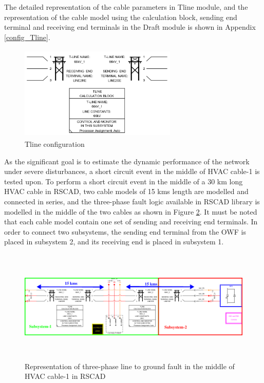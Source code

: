 The detailed representation of the cable parameters in Tline module, and the representation of the cable model using the calculation block, sending end terminal and receiving end terminals in the Draft module is shown in Appendix \ref{config_Tline}.

\begin{figure}[H]
  \centering
  \includegraphics[height = 4.5cm,width = 7.5cm]{Diagrams/Chapter_4/TlineParaBlock.PNG}  
  \caption{Tline configuration}
  \label{fig:Tline_calculationbox_RSCAD}
\end{figure}

As the significant goal is to estimate the dynamic performance of the network under severe disturbances, a short circuit event in the middle of \gls{HVAC} cable-1 is tested upon. To perform a short circuit event in the middle of a 30 km long \gls{HVAC} cable in RSCAD, two cable models of 15 kms length are modelled and connected in series, and the three-phase fault logic available in RSCAD library is modelled in the middle of the two cables as shown in Figure \ref{fig:Subsystem_Trial}. It must be noted that each cable model contain one set of sending and receiving end terminals. In order to connect two subsystems, the sending end terminal from the \gls{OWF} is placed in subsystem 2, and its receiving end is placed in subsystem 1. %

\begin{figure}[H]
\centering
    \includegraphics[height = 5.4cm,width = 17cm]{Diagrams/Chapter_4/subsystem_fault_mark.pdf}
    \caption{Representation of three-phase line to ground fault in the middle of HVAC cable-1 in RSCAD}
    \label{fig:Subsystem_Trial}
\end{figure}

